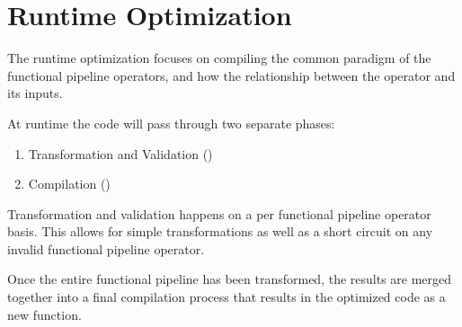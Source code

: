 \section{Runtime Optimization}\label{RuntimeOptimization}
The runtime optimization focuses on compiling the common paradigm of the functional pipeline operators, and how the relationship between the operator and its inputs.

At runtime the code will pass through two separate phases:

\begin{enumerate}
  \item Transformation and Validation ()
  \item Compilation ()
\end{enumerate}

Transformation and validation happens on a per functional pipeline operator basis.  This allows for simple transformations as well as a short circuit on any invalid functional pipeline operator.

Once the entire functional pipeline has been transformed, the results are merged together into a final compilation process that results in the optimized code as a new function. 

\begin{minipage}{\linewidth}

\end{minipage}


